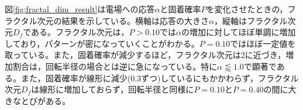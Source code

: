 \documentclass[autodetect-engine,dvi=dvipdfmx,a4paper,ja=standard,oneside,openany,11pt,draft]{bxjsbook}
\begin{document}
図\ref{fig:fractal_dim_result}は電場への応答$\alpha$と固着確率$P$を変化させたときの，フラクタル次元の結果を示している。横軸は応答の大きさ$\alpha$，縦軸はフラクタル次元$D_f$である。フラクタル次元は，$P>0.10$では$\alpha$の増加に対してほぼ単調に増加しており，パターンが密になっていくことがわかる。$P=0.10$ではほぼ一定値を取っている。また，固着確率が減少するほど，フラクタル次元は2に近づき，増加割合は，回転半径の場合とは逆に急になっている。特に$\alpha\lessapprox1.0$で顕著である。また，固着確率が線形に減少(0.3ずつ)しているにもかかわらず，フラクタル次元$D_f$は線形に増加しておらず，回転半径と同様に$P=0.10$と$P=0.40$の間に大きなとびがある。
\ifdraft{
  
  
}{}
\end{document}
